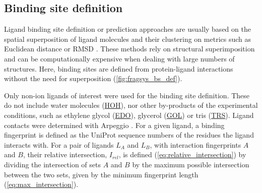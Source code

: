 \subsection{Binding site definition}

Ligand binding site definition or prediction approaches are usually based on the spatial superposition of ligand molecules and their clustering on metrics such as Euclidean distance or RMSD \cite{SHIN_2005_PDBLIGAND, KOZAKOV_2005_CLUSTERING, WASS_2010_3DLIGANDSITE, MCGREIG_2022_3DLIGANDSITE}. These methods rely on structural superimposition and can be computationally expensive when dealing with large numbers of structures. Here, binding sites are defined from protein-ligand interactions without the need for superposition (\autoref{fig:fragsys_bs_def}).

Only non-ion ligands of interest were used for the binding site definition. These do not include water molecules (\href{https://www.ebi.ac.uk/pdbe-srv/pdbechem/chemicalCompound/show/HOH}{HOH}), nor other by-products of the experimental conditions, such as ethylene glycol (\href{https://www.ebi.ac.uk/pdbe-srv/pdbechem/chemicalCompound/show/EDO}{EDO}), glycerol (\href{https://www.ebi.ac.uk/pdbe-srv/pdbechem/chemicalCompound/show/GOL}{GOL}) or tris (\href{https://www.ebi.ac.uk/pdbe-srv/pdbechem/chemicalCompound/show/TRS}{TRS}). Ligand contacts were determined with Arpeggio \cite{JUBB_2017_ARPEGGIO}. For a given ligand, a binding fingerprint is defined as the UniProt sequence numbers of the residues the ligand interacts with. For a pair of ligands $L_{A}$ and $L_{B}$, with interaction fingerprints $A$ and $B$, their relative intersection, $I_{rel}$, is defined (\autoref{eq:relative_intersection}) by dividing the intersection of sets $A$ and $B$ by the maximum possible intersection between the two sets, given by the minimum fingerprint length (\autoref{eq:max_intersection}).

